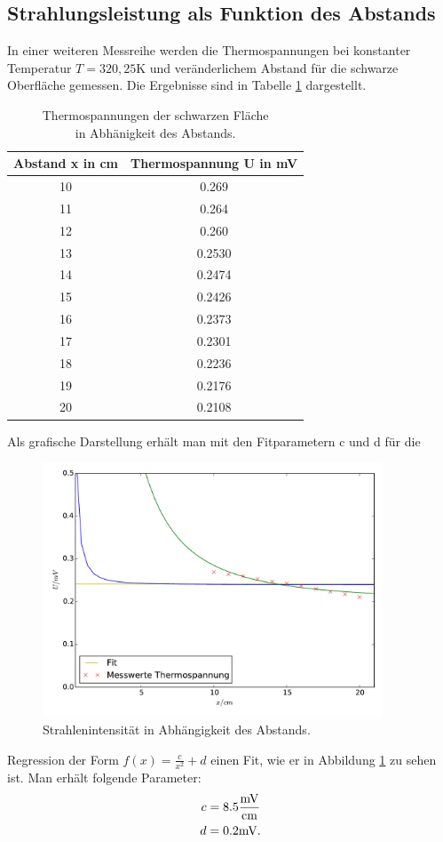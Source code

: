 \subsection{Strahlungsleistung als Funktion des Abstands}
In einer weiteren Messreihe werden die Thermospannungen bei konstanter Temperatur
$T=320,25\si{\kelvin}$ und veränderlichem Abstand für die schwarze Oberfläche
gemessen. Die Ergebnisse sind in Tabelle \ref{tab:thermospannung2} dargestellt.
\begin{table}
  \centering
  \begin{tabular}{c c}
    \toprule
    Abstand x in cm & Thermospannung U in \si{\milli\volt}\\
    \midrule
    10 & 0.269  \\
    11 & 0.264  \\
    12 & 0.260  \\
    13 & 0.2530 \\
    14 & 0.2474 \\
    15 & 0.2426 \\
    16 & 0.2373 \\
    17 & 0.2301 \\
    18 & 0.2236 \\
    19 & 0.2176 \\
    20 & 0.2108 \\
    \bottomrule
  \end{tabular}
 \caption{Thermospannungen der schwarzen Fläche\\in Abhänigkeit des Abstands.}
 \label{tab:thermospannung2}
\end{table}
\newpage
Als grafische Darstellung erhält man mit den Fitparametern c und d für die
\begin{figure}
  \centering
  \includegraphics[width=0.9\textwidth]{strahlintensitaet.pdf}
  \caption{Strahlenintensität in Abhängigkeit des Abstands.}
  \label{fig:strahlintensitaet}
\end{figure}
Regression der Form $f(x) = \frac{c}{x^2} + d $ einen Fit, wie er in Abbildung
\ref{fig:strahlintensitaet} zu sehen ist. Man erhält folgende Parameter:
\begin{align*}
  c &= 8.5 \si{\frac{\milli\volt}{\centi\meter}} \\
  d &= 0.2 \si{\milli\volt}.
\end{align*}

